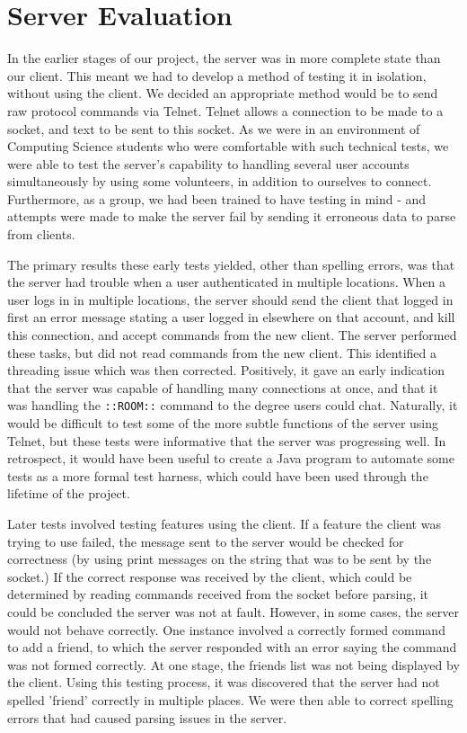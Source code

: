 \section{Server Evaluation}
\label{server_eval}

In the earlier stages of our project, the server was in more complete state than our client. This meant we had to develop a method of testing it in isolation, without using the client. We decided an appropriate method would be to send raw protocol commands via Telnet. Telnet allows a connection to be made to a socket, and text to be sent to this socket. As we were in an environment of Computing Science students who were comfortable with such technical tests, we were able to test the server's capability to handling several user accounts simultaneously by using some volunteers, in addition to ourselves to connect. Furthermore, as a group, we had been trained to have testing in mind - and attempts were made to make the server fail by sending it erroneous data to parse from clients.

The primary results these early tests yielded, other than spelling errors, was that the server had trouble when a user authenticated in multiple locations. When a user logs in in multiple locations, the server should send the client that logged in first an error message stating a user logged in elsewhere on that account, and kill this connection, and accept commands from the new client. The server performed these tasks, but did not read commands from the new client. This identified a threading issue which was then corrected. Positively, it gave an early indication that the server was capable of handling many connections at once, and that it was handling the \texttt{::ROOM::} command to the degree users could chat. Naturally, it would be difficult to test some of the more subtle functions of the server using Telnet, but these tests were informative that the server was progressing well. In retrospect, it would have been useful to create a Java program to automate some tests as a more formal test harness, which could have been used through the lifetime of the project. 	

Later tests involved testing features using the client. If a feature the client was trying to use failed, the message sent to the server would be checked for correctness (by using print messages on the string that was to be sent by the socket.) If the correct response was received by the client, which could be determined by reading commands received from the socket before parsing, it could be concluded the server was not at fault. However, in some cases, the server would not behave correctly. One instance involved a correctly formed command to add a friend, to which the server responded with an error saying the command was not formed correctly. At one stage, the friends list was not being displayed by the client. Using this testing process, it was discovered that the server had not spelled 'friend' correctly in multiple places. We were then able to correct spelling errors that had caused parsing issues in the server.  
